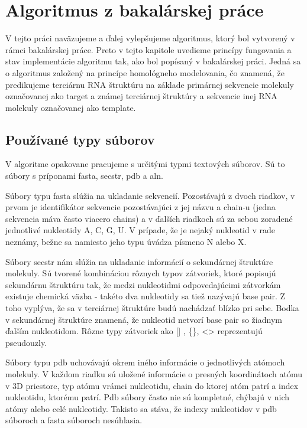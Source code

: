 \chapter{Algoritmus z bakalárskej práce}

V tejto práci naväzujeme a ďalej vylepšujeme algoritmus, ktorý bol vytvorený v rámci bakalárskej práce. Preto v tejto kapitole uvedieme princípy fungovania a stav implementácie algoritmu tak, ako bol popísaný v bakalárskej práci.
Jedná sa o algoritmus založený na princípe homológneho modelovania, čo znamená, že predikujeme terciárnu RNA štruktúru na základe primárnej sekvencie molekuly označovanej ako target a známej terciárnej štruktúry a sekvencie inej RNA molekuly označovanej ako template.

\section{Používané typy súborov}
V algoritme opakovane pracujeme s určitými typmi textových súborov. Sú to súbory s príponami fasta, secstr, pdb a aln.

\indent Súbory typu fasta slúžia na ukladanie sekvencií. Pozostávajú z dvoch riadkov, v prvom je identifikátor sekvencie pozostávajúci z jej názvu a chain-u (jedna sekvencia máva  často viacero chains) a v ďalších riadkoch sú za sebou zoradené jednotlivé nukleotidy A, C, G, U. V prípade, že je nejaký nukleotid v rade neznámy, bežne sa namiesto jeho typu úvádza písmeno N alebo X.


 \indent Súbory secstr nám slúžia na ukladanie informácií o sekundárnej štruktúre molekuly. Sú tvorené kombináciou rôznych typov zátvoriek, ktoré popisujú sekundárnu štruktúru tak, že medzi nukleotidmi odpovedajúcimi zátvorkám existuje chemická väzba - takéto dva nukleotidy sa tiež nazývajú base pair. Z toho vyplýva, že sa v terciárnej štruktúre budú nachádzať blízko pri sebe. Bodka v sekundárnej štruktúre znamená, že nukleotid netvorí base pair so žiadnym ďalším nukleotidom. Rôzne typy zátvoriek  ako [] , \{\}, <> reprezentujú pseudouzly.


\indent Súbory typu pdb uchovávajú okrem iného informácie o jednotlivých atómoch molekuly. V každom riadku sú uložené informácie o presných koordinátoch atómu v 3D priestore, typ atómu vrámci nukleotidu, chain do ktorej atóm patrí a index nukleotidu, ktorému patrí. Pdb súbory často nie sú kompletné, chýbajú v nich atómy alebo celé nukleotidy. Takisto sa stáva, že indexy nukleotidov v pdb súboroch a fasta súboroch nesúhlasia.


